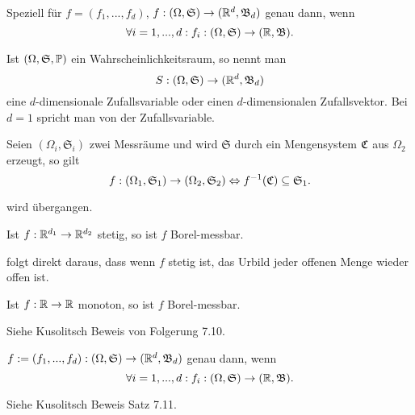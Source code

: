			\begin{bem}
				Speziell für $f=(f_1,...,f_d)$, $f:(\Omega, \mathfrak{S})\to(\R^d, \mathfrak{B}_d)$ genau dann, wenn 
				\[ \forall i=1,...,d: f_i:(\Omega,\mathfrak{S})\to(\R, \mathfrak{B}). \]
			\end{bem}
			
			\begin{defi}
				Ist $(\Omega, \mathfrak{S}, \P)$ ein Wahrscheinlichkeitsraum, so nennt man
				\[ S:(\Omega,\mathfrak{S})\to(\R^d,\mathfrak{B}_d) \]
				eine $d$-dimensionale Zufallsvariable oder einen $d$-dimensionalen Zufallsvektor. Bei $d=1$ spricht man von der Zufallsvariable.
			\end{defi}
			
			\begin{satz}
				Seien $(\Omega_i,\mathfrak{S}_i)$ zwei Messräume und wird $\mathfrak{S}$ durch ein Mengensystem $\mf{C}$ aus $\Omega_2$ erzeugt, so gilt
				\[ f:(\Omega_1,\mathfrak{S}_1)\to (\Omega_2,\mathfrak{S}_2)\Leftrightarrow f^{-1}(\mf{C})\subseteq \mf{S}_1. \] 
			\end{satz}
			
			\begin{bew}
				wird übergangen.
			\end{bew}
			
			\begin{satz}
				Ist $f:\R^{d_1}\to\R^{d_2}$ stetig, so ist $f$ Borel-messbar. 
			\end{satz}
			
			\begin{bew}
				folgt direkt daraus, dass wenn $f$ stetig ist, das Urbild jeder offenen Menge wieder offen ist. 
			\end{bew}
			
			\begin{satz}
				Ist $f:\R\to\R$ monoton, so ist $f$ Borel-messbar. 
			\end{satz}
			
			\begin{bew}
				Siehe Kusolitsch Beweis von Folgerung 7.10.
			\end{bew}
			
			\begin{satz}
				$f:=(f_1,...,f_d): (\Omega, \mf{S})\to(\R^d,\mathfrak{B}_d)$ genau dann, wenn 
				\[ \forall i=1,...,d: f_i:(\Omega,\mf{S})\to(\R,\mf{B}). \]
			\end{satz}
			
			\begin{bew}
				Siehe Kusolitsch Beweis Satz 7.11.
			\end{bew}
			
